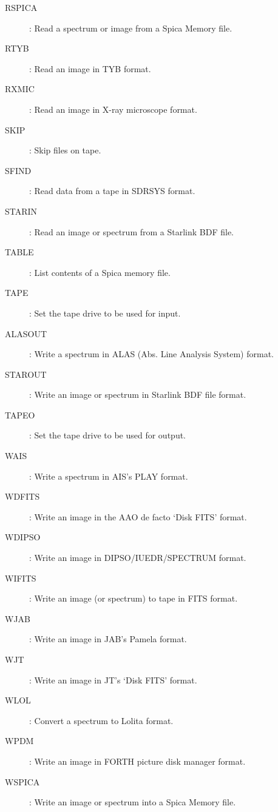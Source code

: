 \begin {description}
\begin{description}
\begin{description}
\item [RSPICA]: Read a spectrum or image from a Spica Memory file.
\item [RTYB]: Read an image in TYB format.
\item [RXMIC]: Read an image in X-ray microscope format.
\item [SKIP]: Skip files on tape.
\item [SFIND]: Read data from a tape in SDRSYS format.
\item [STARIN]: Read an image or spectrum from a Starlink BDF file.
\item [TABLE]: List contents of a Spica memory file.
\item [TAPE]: Set the tape drive to be used for input.
\end{description}

\item [Output:]
\begin{description}
\item [ALASOUT]: Write a spectrum in ALAS (Abs. Line Analysis System) format.
\item [STAROUT]: Write an image or spectrum in Starlink BDF file format.
\item [TAPEO]: Set the tape drive to be used for output.
\item [WAIS]: Write a spectrum in AIS's PLAY format.
\item [WDFITS]: Write an image in the AAO de facto `Disk FITS' format.
\item [WDIPSO]: Write an image in DIPSO/IUEDR/SPECTRUM format.
\item [WIFITS]: Write an image (or spectrum) to tape in FITS format.
\item [WJAB]: Write an image in JAB's Pamela format.
\item [WJT]: Write an image in JT's `Disk FITS' format.
\item [WLOL]: Convert a spectrum to Lolita format.
\item [WPDM]: Write an image in FORTH picture disk manager format.
\item [WSPICA]: Write an image or spectrum into a Spica Memory file.
\end{description}
\end{description}

\item [DISPLAY ---]


\end{description}
